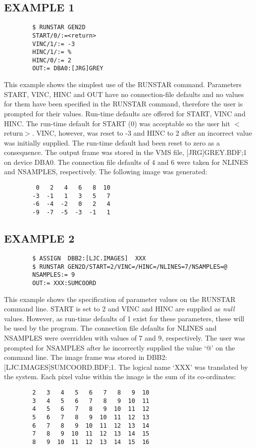\documentclass{article}
\begin{document}
\subsection {EXAMPLE 1}
\begin{verbatim}
        $ RUNSTAR GEN2D
        START/0/:=<return>
        VINC/1/:= -3
        HINC/1/:= %
        HINC/0/:= 2
        OUT:= DBA0:[JRG]GREY
\end{verbatim}
This example shows the simplest use of the RUNSTAR command.
Parameters START, VINC, HINC and OUT have no connection-file defaults and no
values for them have been specified in the RUNSTAR command, therefore the user
is prompted for their values.
Run-time defaults are offered for START, VINC and HINC.
The run-time default for START (0) was acceptable so the user hit $<$return$>$.
VINC, however, was reset to -3 and HINC to 2 after an incorrect value was
initially supplied.
The run-time default had been reset to zero as a consequence.
The output frame was stored in the VMS file, [JRG]GREY.BDF;1 on device DBA0.
The connection file defaults of 4 and 6 were taken for NLINES and NSAMPLES,
respectively.
The following image was generated:
\begin{verbatim}
         0   2   4   6   8  10
        -3  -1   1   3   5   7
        -6  -4  -2   0   2   4
        -9  -7  -5  -3  -1   1
\end{verbatim}
\subsection {EXAMPLE 2}
\begin{verbatim}
        $ ASSIGN  DBB2:[LJC.IMAGES]  XXX
        $ RUNSTAR GEN2D/START=2/VINC=/HINC=/NLINES=7/NSAMPLES=@
        NSAMPLES:= 9
        OUT:= XXX:SUMCOORD
\end{verbatim}
This example shows the specification of parameter values on the RUNSTAR command
line.
START is set to 2 and VINC and HINC are supplied as {\em null} values.
However, as run-time defaults of 1 exist for these parameters, these will be
used by the program.
The connection file defaults for NLINES and NSAMPLES were overridden with
values of 7 and 9, respectively.
The user was prompted for NSAMPLES after he incorrectly supplied the value `@'
on the command line.
The image frame was stored in DBB2:[LJC.IMAGES]SUMCOORD.BDF;1.
The logical name `XXX' was translated by the system.
Each pixel value within the image is the sum of its co-ordinates:
\begin{verbatim}
        2   3   4   5   6   7   8   9  10
        3   4   5   6   7   8   9  10  11
        4   5   6   7   8   9  10  11  12
        5   6   7   8   9  10  11  12  13
        6   7   8   9  10  11  12  13  14
        7   8   9  10  11  12  13  14  15
        8   9  10  11  12  13  14  15  16
\end{verbatim}
\end{document}
